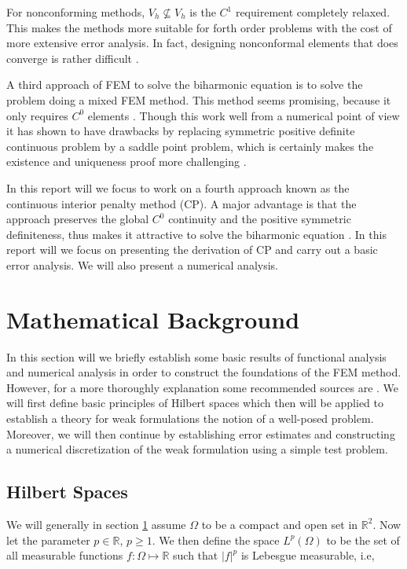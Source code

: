 For nonconforming methods, $V_{h} \not \subseteq  V_{h}$ is the $C^{1}$ requirement completely relaxed. This makes the methods more suitable for forth order problems with the cost of more extensive error analysis. In fact, designing nonconformal
elements that does converge is rather difficult \cite{shi02, nair21}.

A third approach of FEM to solve the biharmonic equation is to solve the problem doing a mixed FEM method. This method seems promising, because it only requires $C^{0}$ elements \cite{chen08, brezzi91}.
Though this work well from a numerical point of view it has shown to have drawbacks by replacing symmetric positive definite continuous problem
by a saddle point problem, which is certainly makes the existence and uniqueness proof more challenging \cite{brezzi74}.

In this report will we focus to work on a fourth approach known as the continuous interior penalty method (CP). A major advantage is that the approach preserves the global $C^{0}$ continuity and the positive symmetric definiteness, thus makes it attractive to solve the biharmonic equation \cite{brenner2012, brenner2012quadratic}. In this report will we focus on presenting the derivation of CP and carry out a basic error analysis. We will also present a numerical analysis.


\section{Mathematical Background}%
\label{sub:mathematical_background}

In this section will we briefly establish some basic results of functional analysis and numerical analysis in order to construct the foundations of the FEM method. However, for a more thoroughly explanation some recommended sources are
\cite{brenner07math,manzoni2021optimal, quartdiff}. We will first define basic principles of Hilbert spaces which then will be applied to establish a theory for weak formulations the notion of a well-posed problem. Moreover, we will then continue by
establishing error estimates and constructing a numerical discretization of the weak formulation using a simple test problem.

\subsection{Hilbert Spaces}%
\label{sub:hilbert_spaces}

We will generally in section \ref{sub:mathematical_background} assume $\Omega $ to be a compact and open set in $\mathbb{R} ^{2}$. Now let the parameter $p \in \mathbb{R} $, $p\ge 1$. We then define the space $L^{p}\left( \Omega  \right) $ to be the set of all measurable functions $f: \Omega  \mapsto \mathbb{R} $ such that
$\left\lvert f \right\rvert ^{p}$ is Lebesgue measurable, i.e,

